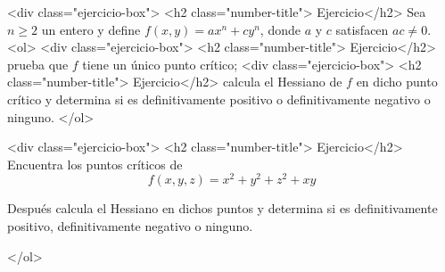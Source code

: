\documentclass{article}
\theoremstyle{definition}
\begin{document}
  <div class="ejercicio-box"> <h2 class="number-title"> Ejercicio</h2> Sea $n\geq 2$ un entero y define $f(x,y)=ax^n+cy^n$, donde
    $a$ y $c$ satisfacen $ac\ne 0$.
    <ol>
    <div class="ejercicio-box"> <h2 class="number-title"> Ejercicio</h2> prueba que $f$ tiene un único punto crítico;
    <div class="ejercicio-box"> <h2 class="number-title"> Ejercicio</h2> calcula el Hessiano de $f$ en dicho punto crítico
      y determina si es definitivamente positivo o definitivamente
      negativo o ninguno.
    </ol>

  <div class="ejercicio-box"> <h2 class="number-title"> Ejercicio</h2> Encuentra los puntos críticos de
    $$
    f(x,y,z)=x^2+y^2+z^2+xy
    $$

    Después calcula el Hessiano en dichos puntos y determina si es
    definitivamente positivo, definitivamente negativo o ninguno.

 
  </ol>
  

  
\end{document}
